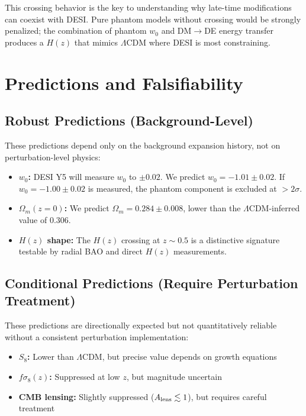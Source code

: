 \documentclass[twocolumn,showpacs,preprintnumbers,amsmath,amssymb,prd]{revtex4-2}
\begin{document}
This crossing behavior is the key to understanding why late-time modifications can coexist with DESI. Pure phantom models without crossing would be strongly penalized; the combination of phantom $w_0$ and DM$\to$DE energy transfer produces a $H(z)$ that mimics $\Lambda$CDM where DESI is most constraining.

\section{Predictions and Falsifiability}
\label{sec:predictions}

\subsection{Robust Predictions (Background-Level)}

These predictions depend only on the background expansion history, not on perturbation-level physics:

\begin{itemize}
    \item \textbf{$w_0$:} DESI Y5 will measure $w_0$ to $\pm 0.02$. We predict $w_0 = -1.01 \pm 0.02$. If $w_0 = -1.00 \pm 0.02$ is measured, the phantom component is excluded at $>2\sigma$.
    
    \item \textbf{$\Omega_m(z=0)$:} We predict $\Omega_m = 0.284 \pm 0.008$, lower than the $\Lambda$CDM-inferred value of $0.306$.
    
    \item \textbf{$H(z)$ shape:} The $H(z)$ crossing at $z \sim 0.5$ is a distinctive signature testable by radial BAO and direct $H(z)$ measurements.
\end{itemize}

\subsection{Conditional Predictions (Require Perturbation Treatment)}

These predictions are directionally expected but not quantitatively reliable without a consistent perturbation implementation:

\begin{itemize}
    \item \textbf{$S_8$:} Lower than $\Lambda$CDM, but precise value depends on growth equations
    \item \textbf{$f\sigma_8(z)$:} Suppressed at low $z$, but magnitude uncertain
    \item \textbf{CMB lensing:} Slightly suppressed ($A_{\rm lens} \lesssim 1$), but requires careful treatment
\end{itemize}
\end{document}

